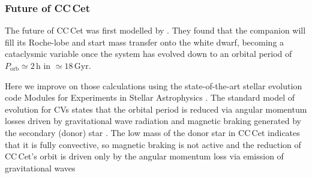 \documentclass[fleqn,usenatbib]{mnras}
\newcommand{\Msun}{\mbox{$\mathrm{M}_{\odot}$}}
\newcommand{\bgc}[1]{\textcolor{orange}{[#1]}}
\newcommand{\bgs}[1]{\textcolor{orange}{#1}}
\begin{document}



\subsubsection{Future of CC\,Cet}
\label{sec:future}

The future of CC\,Cet was first modelled by \citet{schreiber+gaensicke03-1}. They found that the companion will fill its Roche-lobe and start mass transfer onto the white dwarf, becoming a cataclysmic variable once the system has evolved down to an orbital period of $P_\mathrm{orb}\simeq2$\,h in $\simeq18$\,Gyr. 


Here we improve on those calculations using the state-of-the-art stellar evolution code Modules for Experiments in Stellar Astrophysics  \citep[{\tt MESA} v.12778,][]{paxtonetal11-1, paxtonetal13-1, paxtonetal15-1, paxtonetal18-1, paxtonetal19-1}. The standard model of evolution for CVs states that the orbital period is reduced via angular momentum losses driven by gravitational wave radiation \citep{paczynski67-1} and magnetic braking generated by the secondary (donor) star \citep{verbunt+zwaan81-1, rappaportetal83-1, mestel+spruit87-1, kawaler88-1, andronovetal03-1}. The low mass of the donor star in CC\,Cet indicates that it is fully convective, so magnetic braking is not active and the reduction of CC\,Cet's orbit is driven only by the angular momentum loss via emission of gravitational waves





\end{document}
